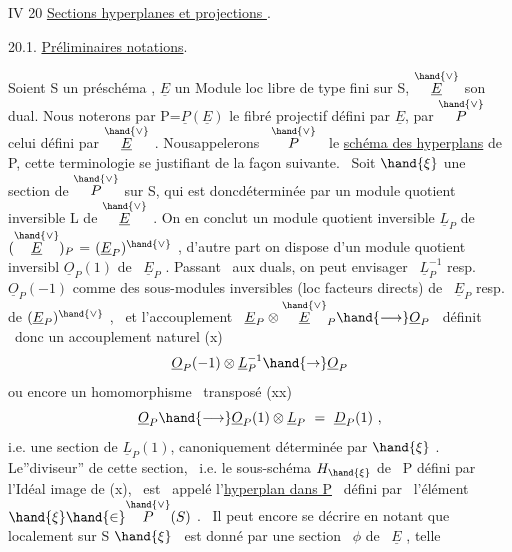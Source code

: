IV 20 \quad \uline{Sections hyperplanes et projections }.

20.1. \quad \uline{Préliminaires  notations}.

Soient S un \quad préschéma , $\underline{E}$ un Module loc libre de type fini sur S,
$\overset{\hand{\vee}}{\underline{E}}$ son dual. Nous noterons par P=$\underline{P}(\underline{E})$ le fibré projectif défini par $\underline{E}$,
par $\overset{\hand{\vee}}{P}$ celui défini par $\overset{\hand{\vee}}{\underline{E}}$ . Nousappelerons \ $\overset{\hand{\vee}}{P}$ \ le \uline{schéma des hyperplans}
de P, cette terminologie se justifiant de la façon suivante. \ Soit
$\hand{\xi}$ une section de $\overset{\hand{\vee}}{P}$ sur S, qui est donc\hand{/}déterminée par un module quotient
inversible L de $\overset{\hand{\vee}}{\underline{E}}$ . On en conclut un module quotient inversible
$\underline{L}_P$ de$(\overset{\hand{\vee}}{\underline{E}})_P$ = $(\underline{E}_P)^{\hand{\vee}}$ , d'autre part on dispose d'un module quotient inversibl
$\underline{O}_P(1)$ de \ $\underline{E}_P$ . Passant \ aux duals, on peut envisager \ $\underline{L}_P^{-1}$ resp. $\underline{O}_P(-1)$
comme des sous-modules inversibles (loc facteurs directs) de \ $\underline{E}_P$ resp.
de $(\underline{E}_P)^{\hand{\vee}}$ , \ et l'accouplement \ $\underline{E}_P \otimes \overset{\hand{\vee}}{\underline{E}}_P \hand{\longrightarrow} \underline{O}_P$ \ définit \ donc un
accouplement naturel
(x) \[ \underline{O}_P(-1)\otimes\underline{L}_P^{-1} \hand{\to} \underline{O}_P \]
ou encore un homomorphisme \ transposé
\margin{$\|$}
(xx) \[ \underline{O}_P \hand{\longrightarrow} \underline{O}_P(1)\otimes\underline{L}_P \ = \ \underline{D}_P(1) \ , \]
i.e. une section de $\underline{L}_P(1)$, canoniquement déterminée par $\hand{\xi}$ . Le''diviseur''
de cette section, \ i.e. le sous-schéma $H_{\hand{\xi}}$ de \ P défini par l'Idéal
image de (x), \ est \ appelé l'\uline{hyperplan dans P} \ défini par \ l'élément
$\hand{\xi} \hand{\in} \overset{\hand{\vee}}{P}(S)$ . \ Il peut encore se décrire en notant que localement sur S 
 \quad $\hand{\xi}$ \ est donné par une section \ $\phi$ de \ $\underline{E}$ ,  telle
